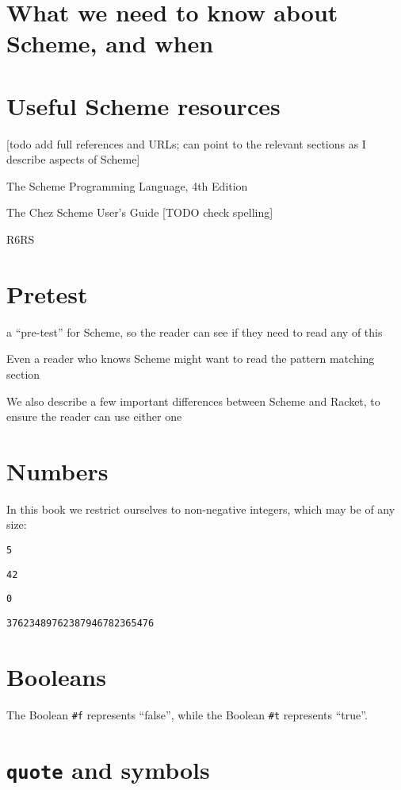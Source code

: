 \documentclass{book}
\begin{document}
\section{What we need to know about Scheme, and when}

\section{Useful Scheme resources}

[todo add full references and URLs; can point to the relevant sections as I describe aspects of Scheme]

The Scheme Programming Language, 4th Edition

The Chez Scheme User's Guide [TODO check spelling]

R6RS

\section{Pretest}

a ``pre-test'' for Scheme, so the reader can see if they need to read any of this

Even a reader who knows Scheme might want to read the pattern matching section

We also describe a few important differences between Scheme and Racket, to ensure the reader can use either one


\section{Numbers}

In this book we restrict ourselves to non-negative integers, which may be of any size:

\verb|5|

\verb|42|

\verb|0|

\verb|37623489762387946782365476|

\section{Booleans}

The Boolean \verb|#f| represents ``false'', while
the Boolean \verb|#t| represents ``true''.

\section{\texttt{quote} and symbols}
\end{document}
